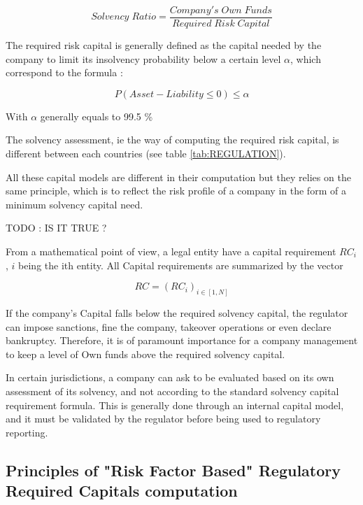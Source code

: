 \begin{equation}
	Solvency \; Ratio = \frac{Company's \; Own \; Funds}{Required \; Risk \; Capital}
\end{equation}

The required risk capital is generally defined as the capital needed by the company to limit its insolvency probability below a certain level $\alpha$, which correspond to the formula \cite{solvency_requirement} :

\begin{equation}
	P(Asset - Liability \leq 0) \leq \alpha
\end{equation}

With $\alpha$ generally equals to 99.5 \%

The solvency assessment, ie the way of computing the required risk capital, is different between each countries (see table \ref{tab:REGULATION}).

All these capital models are different in their computation but they relies on the same principle, which is to reflect the risk profile of a company in the form of a minimum solvency capital need.

TODO : IS IT TRUE ?

From a mathematical point of view, a legal entity have a capital requirement $RC_i$, $i$ being the ith entity. All Capital requirements are summarized by the vector 

\begin{equation}
    RC = (RC_i)_{i \in [1, N]}
\end{equation}


If the company's Capital falls below the required solvency capital, the regulator can impose sanctions, fine the company, takeover operations or even declare bankruptcy. Therefore, it is of paramount importance for a company management to keep a level of Own funds above the required solvency capital.

In certain jurisdictions, a company can ask to be evaluated based on its own assessment of its solvency, and not according to the standard solvency capital requirement formula. This is generally done through an internal capital model, and it must be validated by the regulator before being used to regulatory reporting.


\subsection{Principles of "Risk Factor Based" Regulatory Required Capitals computation}
\label{sec:RRC_PRINCIPLE}

